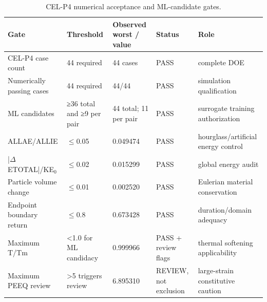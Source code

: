 \begin{table}[t]
\centering
\caption{CEL-P4 numerical acceptance and ML-candidate gates.}
\label{tab:numerical_gates}
\begin{tabular}{lllll}
\hline
Gate & Threshold & Observed worst / value & Status & Role \\
\hline
CEL-P4 case count & 44 required & 44 cases & PASS & complete DOE \\
Numerically passing cases & 44 required & 44/44 & PASS & simulation qualification \\
ML candidates & ≥36 total and ≥9 per pair & 44 total; 11 per pair & PASS & surrogate training authorization \\
ALLAE/ALLIE & $\leq$0.05 & 0.049474 & PASS & hourglass/artificial energy control \\
|$\Delta$ETOTAL|/KE$_0$ & $\leq$0.02 & 0.015299 & PASS & global energy audit \\
Particle volume change & $\leq$0.01 & 0.002520 & PASS & Eulerian material conservation \\
Endpoint boundary return & $\leq$0.8 & 0.673428 & PASS & duration/domain adequacy \\
Maximum T/Tm & <1.0 for ML candidacy & 0.999966 & PASS + review flags & thermal softening applicability \\
Maximum PEEQ review & >5 triggers review & 6.895310 & REVIEW, not exclusion & large-strain constitutive caution \\
\hline
\end{tabular}
\end{table}
